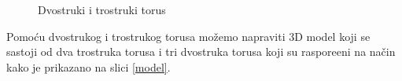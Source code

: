 \documentclass[a4paper,12pt]{article}
\theoremstyle{zad}
\begin{document}
\begin{figure}[!h]
\centering
{}\hspace*{0.5cm}
\hspace*{0.5cm}
\caption{Dvostruki i trostruki torus}
\end{figure}
\noindent Pomo\'cu dvostrukog i trostrukog torusa možemo napraviti 3D model koji se sastoji od dva tro\-stru\-ka torusa 
i tri dvostruka torusa koji su raspore\dj eni na na\v{c}in kako je prikazano na slici \ref{model}.

\newpage
\end{document}
